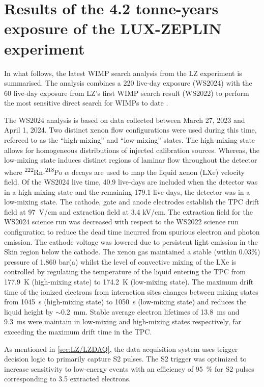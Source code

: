 \chapter{Results of the 4.2 tonne-years exposure of the LUX-ZEPLIN experiment}\label{chap:WS2024Result}
In what follows, the latest WIMP search analysis from the LZ experiment is summarised. The analysis combines a 220 live-day exposure (WS2024) with the 60 live-day exposure from LZ's first WIMP search result (WS2022) \cite{LZ:2022lsv} to perform the most sensitive direct search for WIMPs to date \cite{LZCollaboration:2024lux}.

The WS2024 analysis is based on data collected between March 27, 2023 and April 1, 2024. Two distinct xenon flow configurations were used during this time, refereed to as the ``high-mixing'' and ``low-mixing'' states. The high-mixing state allows for homogeneous distributions of injected calibration sources. Whereas, the low-mixing state induces distinct regions of laminar flow throughout the detector where \textsuperscript{222}Rn-\textsuperscript{218}Po $\alpha$ decays are used to map the liquid xenon (LXe) velocity field. Of the WS2024 live time, 40.9 live-days are included when the detector was in a high-mixing state and the remaining 179.1 live-days, the detector was in a low-mixing state. The cathode, gate and anode electrodes establish the TPC drift field at 97~V/cm and extraction field at 3.4 kV/cm. The extraction field for the WS2024 science run was decreased with respect to the WS2022 science run configuration to reduce the dead time incurred from spurious electron and photon emission. The cathode voltage was lowered due to persistent light emission in the Skin region below the cathode.
The xenon gas maintained a stable (within 0.03\%) pressure of 1.860 bar(a) whilst the level of convective mixing of the LXe is controlled by regulating the temperature of the liquid entering the TPC from 177.9~K (high-mixing state) to 174.2~K (low-mixing state). The maximum drift time of the ionized electrons from interaction sites changes between mixing states from 1045~\textmu s (high-mixing state) to 1050~\textmu s (low-mixing state) and reduces the liquid height by $\sim0.2$~mm. Stable average electron lifetimes of 13.8~ms and 9.3~ms were maintain in low-mixing and high-mixing states respectively, far exceeding the maximum drift time in the TPC.

As mentioned in \autoref{sec:LZ/LZDAQ}, the data acquisition system uses trigger decision logic to primarily capture S2 pulses. The S2 trigger was optimized to increase sensitivity to low-energy events with an efficiency of 95~\% for S2 pulses corresponding to 3.5 extracted electrons.

